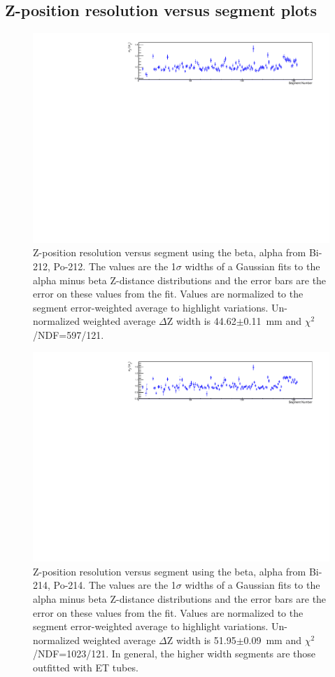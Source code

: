 \subsection{Z-position resolution versus segment plots}
\begin{figure}[!h]
\centering
\includegraphics[width=1.05\textwidth]{figures/PubBiPo212dZWidthvsCell.pdf}
\caption{\label{fig:ZresvsCell212}Z-position resolution versus segment using the beta, alpha from Bi-212, Po-212. The values are the 1$\sigma$ widths of a Gaussian fits to the alpha minus beta Z-distance distributions and the error bars are the error on these values from the fit. Values are normalized to the segment error-weighted average to highlight variations. Un-normalized weighted average $\Delta$Z width is 44.62$\pm$0.11~mm and $\chi^2$/NDF=597/121.}
\end{figure}
\begin{figure}[!h]
\centering
\includegraphics[width=1.05\textwidth]{figures/PubBiPo214dZWidthvsCell.pdf}
\caption{\label{fig:ZresvsCell214}Z-position resolution versus segment using the beta, alpha from Bi-214, Po-214. The values are the 1$\sigma$ widths of a Gaussian fits to the alpha minus beta Z-distance distributions and the error bars are the error on these values from the fit. Values are normalized to the segment error-weighted average to highlight variations. Un-normalized weighted average $\Delta$Z width is 51.95$\pm$0.09~mm and $\chi^2$/NDF=1023/121. In general, the higher width segments are those outfitted with ET tubes.}
\end{figure}
